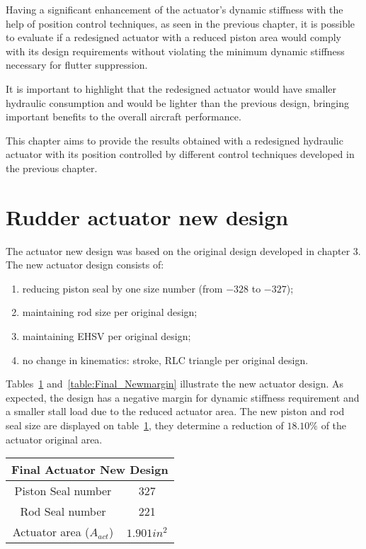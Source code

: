 Having a significant enhancement of the actuator's dynamic stiffness with the help of position control techniques, as seen in the previous chapter, it is possible to evaluate if a redesigned actuator with a reduced piston area would comply with its design requirements without violating the minimum dynamic stiffness necessary for flutter suppression. 

It is important to highlight that the redesigned actuator would have smaller hydraulic consumption and would be lighter than the previous design, bringing important benefits to the overall aircraft performance. 

This chapter aims to provide the results obtained with a redesigned hydraulic actuator with its position controlled by different control techniques developed in the previous chapter.

\section{Rudder actuator new design}

The actuator new design was based on the original design developed in chapter 3. The new actuator design consists of:
\begin{enumerate}[i]
\item reducing piston seal by one size number (from $-328$ to $-327$);
\item maintaining rod size per original design;
\item maintaining EHSV per original design;
\item no change in kinematics: stroke, RLC triangle per original design.
\end{enumerate}

Tables~\ref{table:Final_Newdesign} and~\ref{table:Final_Newmargin} illustrate the new actuator design. As expected, the design has a negative margin for dynamic stiffness requirement and a smaller stall load due to the reduced actuator area. The new piston and rod seal size are displayed on table~\ref{table:Final_Newdesign}, they determine a reduction of $18.10\%$ of the actuator original area.

\begin{table}[H]
    \label{table:Final_Newdesign}
	\centering
    \begin{tabular}{|c|c|}
    \hline
    \multicolumn{2}{|c|}{Final Actuator New Design} \\ \hline
    Piston Seal number & 327           \\ \hline
    Rod Seal number & 221 \\ \hline
    Actuator area ($A_{act}$) & $1.901 in^2$ \\ \hline
        \end{tabular}

\end{table}

